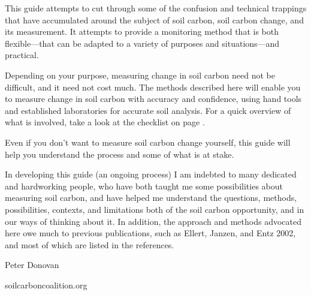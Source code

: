 \documentclass[11pt,letterpaper,oneside,onecolumn]{memoir}
\begin{document}
This guide attempts to cut through some of the confusion and technical trappings that have accumulated around the subject of soil carbon, soil carbon change, and its measurement. It attempts to provide a monitoring method that is both flexible---that can be adapted to a variety of purposes and situations---and practical.

Depending on your purpose, measuring change in soil carbon need not be difficult, and it need not cost much. The methods described here will enable you to measure change in soil carbon with accuracy and confidence, using hand tools and established laboratories for accurate soil analysis. For a quick overview of what is involved, take a look at the checklist on page \pageref{checklist}.

Even if you don't want to measure soil carbon change yourself, this guide will help you understand the process and some of what is at stake.

In developing this guide (an ongoing process) I am indebted to many dedicated and hardworking people, who have both taught me some possibilities about measuring soil carbon, and have helped me understand the questions, methods, possibilities, contexts, and limitations both of the soil carbon opportunity, and in our ways of thinking about it. In addition, the approach and methods advocated here owe much to previous publications, such as Ellert, Janzen, and Entz 2002, and most of which are listed in the references.

\vspace{1em}
\hfill Peter Donovan

\hfill soilcarboncoalition.org


\mainmatter
\pagestyle{myheadings}
\renewcommand{\chaptermark}[1]{\markboth{#1}{}}


\end{document}
